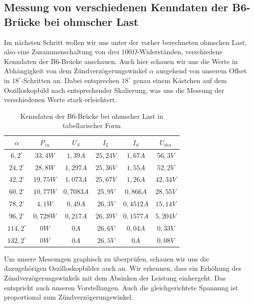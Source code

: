 \documentclass{article}
\begin{document}
\subsection{Messung von verschiedenen Kenndaten der B6-Brücke bei ohmscher Last}

Im nächsten Schritt wollen wir uns unter der vorher berechneten ohmschen Last, also eine Zusammenschaltung von drei $100\Omega$-Widerständen, verschiedene Kenndaten der B6-Brücke anschauen. Auch hier schauen wir uns die Werte in Abhängigkeit von dem Zündverzögerungswinkel $\alpha$ ausgehend von unserem Offset in $18^{\circ}$-Schritten an. Dabei entsprechen $18^{\circ}$ genau einem Kästchen auf dem Oszilloskopbild nach entsprechender Skalierung, was uns die Messung der verschiedenen Werte stark erleichtert.
\newpage
\begin{table}[h]
  \centering
  \begin{tabular}{|c|c|c|c|c|c|}
    \hline
    $\alpha$ & $P_{zu}$ & $U_{S}$ & $I_{L}$ & $I_{d}$ & $U_{di\alpha}$\\
    \hline
    $6,2^{\circ}$ & $33,4W$ & $1,39A$ & $25,24V$ & $1,67A$ & $56,3V$\\
    \hline
    $24,2^{\circ}$ & $28,8W$ & $1,297A$ & $25,36V$ & $1,55A$ & $52,2V$\\
    \hline
    $42,2^{\circ}$ & $19,75W$ & $1,073A$ & $25,67V$ & $1,26A$ & $42,34V$\\
    \hline
    $60,2^{\circ}$ & $10,77W$ & $0,7083A$ & $25,9V$ & $0,866A$ & $28,55V$\\
    \hline
    $78,2^{\circ}$ & $4,1W$ & $0,49A$ & $26,3V$ & $0,4512A$ & $15,14V$ \\
    \hline
    $96,2^{\circ}$ & $0,728W$ & $0,217A$ & $26,39V$ & $0,1577A$ & $5,204V$\\
    \hline
    $114,2^{\circ}$ & $0W$ & $0A$ & $26,6V$ & $0,04A$ & $0,33V$\\
    \hline
    $132,2^{\circ}$ & $0W$ & $0A$ & $26,5V$ & $0A$ & $0,08V$\\
    \hline
  \end{tabular}
  \caption{Kenndaten der B6-Brücke bei ohmscher Last in tabellarischer Form}
  \label{tab:mess2}
\end{table}


Um unsere Messungen graphisch zu überprüfen, schauen wir uns die dazugehörigen Oszilloskopbilder auch an. Wir erkennen, dass ein Erhöhung des Zündverzögerungswinkels mit dem Absinken der Leistung einhergeht. Das entspricht auch unseren Vorstellungen. Auch die gleichgerichtete Spannung ist proportional zum Zündverzögerungswinkel.
\end{document}
